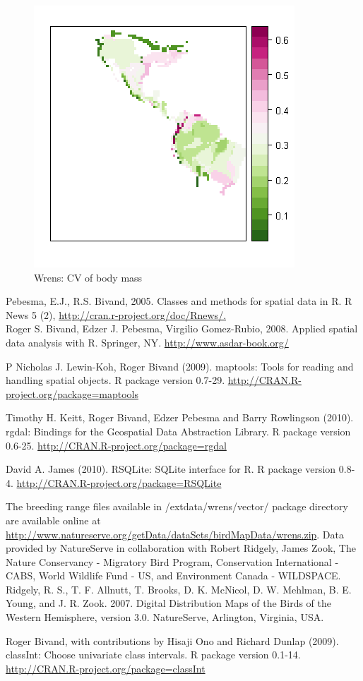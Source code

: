 \documentclass[ a4paper ]{article}
\begin{document}
	
		\begin{figure}[htbp]
  \begin{center}
	\includegraphics[width=0.5\linewidth]{map2b}
    \caption{\label{fig:map2b} Wrens: CV of body mass}
  \end{center}
\end{figure}	
	
\pagebreak		
\begin{thebibliography}{1}

	Pebesma, E.J., R.S. Bivand, 2005. Classes and methods for spatial data in R. R News 5 (2), 
			\url{http://cran.r-project.org/doc/Rnews/.}\\
	Roger S. Bivand, Edzer J. Pebesma, Virgilio Gomez-Rubio, 2008. Applied spatial data analysis with R. Springer, NY. 
			\url{http://www.asdar-book.org/}
			
	P Nicholas J. Lewin-Koh, Roger Bivand (2009). maptools: Tools for reading and handling spatial objects. R package version 0.7-29. \url{http://CRAN.R-project.org/package=maptools}			

	Timothy H. Keitt, Roger Bivand, Edzer Pebesma and Barry Rowlingson (2010). rgdal: Bindings for the Geospatial Data
	Abstraction Library. R package version 0.6-25. \url{http://CRAN.R-project.org/package=rgdal }

 David A. James (2010). RSQLite: SQLite interface for R. R package version 0.8-4. \url{http://CRAN.R-project.org/package=RSQLite}
  
	 The breeding range files available in /extdata/wrens/vector/  package directory are available online at \url{http://www.natureserve.org/getData/dataSets/birdMapData/wrens.zip}. Data provided by NatureServe in collaboration with Robert Ridgely, James Zook, The Nature Conservancy - Migratory Bird Program, Conservation International - CABS, World Wildlife Fund - US, and Environment Canada - WILDSPACE.\\
Ridgely, R. S., T. F. Allnutt, T. Brooks, D. K. McNicol, D. W. Mehlman, B. E. Young, and J. R. Zook. 2007. Digital Distribution Maps of the Birds of the Western Hemisphere, version 3.0. NatureServe, Arlington, Virginia, USA.

Roger Bivand, with contributions by Hisaji Ono and Richard Dunlap (2009). classInt: Choose univariate class intervals. R package version 0.1-14. \url{http://CRAN.R-project.org/package=classInt}


\end{thebibliography}
\end{document}
